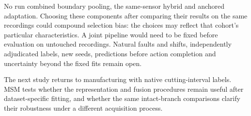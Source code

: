 No run combined boundary pooling, the same-sensor hybrid and anchored adaptation.
Choosing these components after comparing their results on the same recordings could
compound selection bias: the choices may reflect that cohort's particular
characteristics. A joint pipeline would need to be fixed before evaluation on untouched
recordings. Natural faults and shifts, independently adjudicated labels, new seeds,
predictions before action completion and uncertainty beyond the fixed fits remain
open.

The next study returns to manufacturing with native cutting-interval labels. MSM tests
whether the representation and fusion procedures remain useful after dataset-specific
fitting, and whether the same intact-branch comparisons clarify their robustness under
a different acquisition process.
